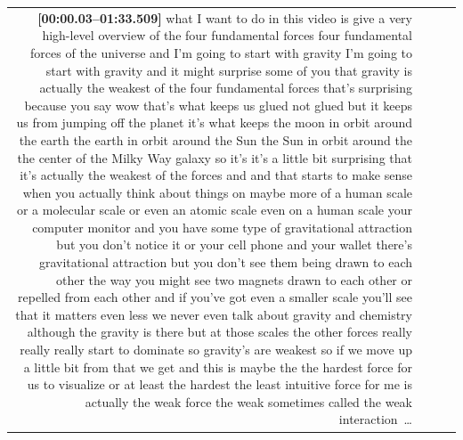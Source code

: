 \documentclass[10pt]{article}
\begin{document}
\begin{tiny}
\begin{longtable}{r p{0.3in} p{1.212in} p{3.8in}}
                                                                                                                                                                                                                               \textbf{[00:00.03--01:33.509]} what I want to do in this video is give a very high-level overview of the four fundamental forces four fundamental forces of the universe and I'm going to start with gravity I'm going to start with gravity and it might surprise some of you that gravity is actually the weakest of the four fundamental forces that's surprising because you say wow that's what keeps us glued not glued but it keeps us from jumping off the planet it's what keeps the moon in orbit around the earth the earth in orbit around the Sun the Sun in orbit around the the center of the Milky Way galaxy so it's it's a little bit surprising that it's actually the weakest of the forces and and that starts to make sense when you actually think about things on maybe more of a human scale or a molecular scale or even an atomic scale even on a human scale your computer monitor and you have some type of gravitational attraction but you don't notice it or your cell phone and your wallet there's gravitational attraction but you don't see them being drawn to each other the way you might see two magnets drawn to each other or repelled from each other and if you've got even a smaller scale you'll see that it matters even less we never even talk about gravity and chemistry although the gravity is there but at those scales the other forces really really really start to dominate so gravity's are weakest so if we move up a little bit from that we get and this is maybe the the hardest force for us to visualize or at least the hardest the least intuitive force for me is actually the weak force the weak sometimes called the weak interaction~\ldots \\

\end{longtable}
\end{tiny}
\end{document}
